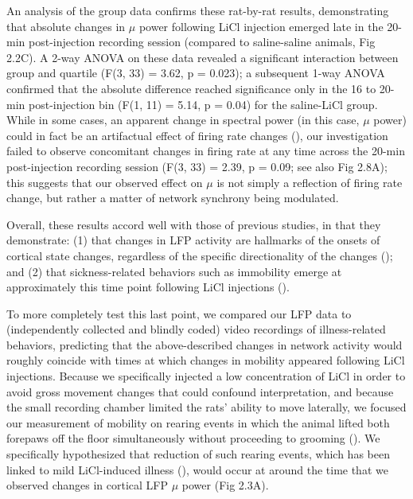 \begin{refsection}
An analysis of the group data confirms these rat-by-rat results, demonstrating that absolute changes in \(\mu\) power following LiCl injection emerged late in the 20-min post-injection recording session (compared to saline-saline animals, Fig 2.2C). A 2-way ANOVA on these data revealed a significant interaction between group and quartile (F(3, 33) = 3.62, p = 0.023); a subsequent 1-way ANOVA confirmed that the absolute difference reached significance only in the 16 to 20-min post-injection bin (F(1, 11) = 5.14, p = 0.04) for the saline-LiCl group. While in some cases, an apparent change in spectral power (in this case, \(\mu\) power) could in fact be an artifactual effect of firing rate changes (\cite{waldert2013a}), our investigation failed to observe concomitant changes in firing rate at any time across the 20-min post-injection recording session (F(3, 33) = 2.39, p = 0.09; see also Fig 2.8A); this suggests that our observed effect on \(\mu\) is not simply a reflection of firing rate change, but rather a matter of network synchrony being modulated.

Overall, these results accord well with those of previous studies, in that they demonstrate: (1) that changes in LFP activity are hallmarks of the onsets of cortical state changes, regardless of the specific directionality of the changes (\cite{pachitariu2015a,zhou2014a,tan2014a,zucca2019a}); and (2) that sickness-related behaviors such as immobility emerge at approximately this time point following LiCl injections (\cite{nachman1975a,cross-mellor2009a,parker2004a,tomasiewicz2006a,l2019a,smith1978a}).

To more completely test this last point, we compared our LFP data to (independently collected and blindly coded) video recordings of illness-related behaviors, predicting that the above-described changes in network activity would roughly coincide with times at which changes in mobility appeared following LiCl injections. Because we specifically injected a low concentration of LiCl in order to avoid gross movement changes that could confound interpretation, and because the small recording chamber limited the rats’ ability to move laterally, we focused our measurement of mobility on rearing events in which the animal lifted both forepaws off the floor simultaneously without proceeding to grooming (\cite{grill1978a,grill1978b}). We specifically hypothesized that reduction of such rearing events, which has been linked to mild LiCl-induced illness (\cite{smith1978a}), would occur at around the time that we observed changes in cortical LFP \(\mu\) power (Fig 2.3A).


\end{refsection}
